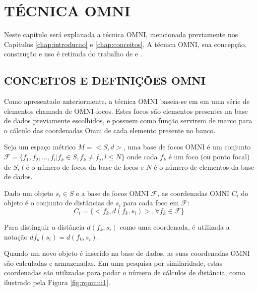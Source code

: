 \chapter{TÉCNICA OMNI}
\label{chap:omni}

Neste capítulo será explanada a técnica OMNI, mencionada previamente nos Capítulos \ref{chap:introducao} e \ref{chap:conceitos}.
A técnica OMNI, sua concepção, construção e uso é retirada do trabalho de \cite{Traina2001} e \cite{Traina2007}.


\section{CONCEITOS E DEFINIÇÕES OMNI}
\label{sec:defomni}
Como apresentado anteriormente, a técnica OMNI baseia-se em em uma série de elementos chamada de 
OMNI-focos. Estes focos são elementos presentes na base de dados previamente escolhidos, e possuem como função 
servirem de marco para o cálculo das coordenadas Omni de cada elemento presente no banco.

\begin{mydef}
 \label{def:omnifoco}
 Seja um espaço métrico $M = <S,d>$, uma base de focos OMNI é um conjunto 
 $\mathscr{F} = \{f_1, f_2, ..., f_l | f_k \in S, f_k \neq f_j, l \leq N \}$ onde cada $f_k$ é um foco
 (ou ponto focal) de $S$, $l$ é o número de focos da base de focos e $N$ é o número de elementos da base de dados.
\end{mydef}

\begin {mydef}
 \label{def:omnicoord}
 Dado um objeto $s_i \in S$ e a base de focos OMNI $\mathscr{F}$, as coordenadas OMNI $C_i$ do objeto é o conjunto
 de distâncias de $s_i$ para cada foco em $\mathscr{F}$:
 \begin{equation}
  C_i = \{ <f_k, d(f_k, s_i)>, \forall f_k \in \mathscr{F} \}
 \end{equation}
\end {mydef}

Para distinguir a distância $d(f_k, s_i)$ como uma coordenada, é utilizada a notação $df_k(s_i) = d(f_k, s_i)$.\par
									
Quando um novo objeto é inserido na base de dados, as suas coordenadas OMNI são calculadas e armazenadas. Em uma pesquisa por
similaridade, estas coordenadas são utilizadas para podar o número de cálculos de distância, como ilustrado pela Figura \ref{fig:rqomni1}.\par

